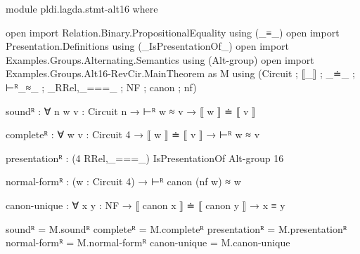 \begin{code}[hide]
module pldi.lagda.stmt-alt16 where

open import Relation.Binary.PropositionalEquality using (_≡_)
open import Presentation.Definitions using (_IsPresentationOf_)
open import Examples.Groups.Alternating.Semantics using (Alt-group)
open import Examples.Groups.Alt16-RevCir.MainTheorem as M
  using (Circuit ; ⟦_⟧ ; _≐_ ; ⊢ᴿ_≈_ ; _RRel,_===_ ; NF ; canon ; nf)
\end{code}
\begin{code}[number=agda:x-sound]
soundᴿ : ∀ {n} {w v : Circuit n} → ⊢ᴿ w ≈ v → ⟦ w ⟧ ≐ ⟦ v ⟧
\end{code}
\begin{code}[number=agda:x-complete]
completeᴿ : ∀ {w v : Circuit 4} → ⟦ w ⟧ ≐ ⟦ v ⟧ → ⊢ᴿ w ≈ v
\end{code}
\begin{code}[number=agda:x-alt]
presentationᴿ : (4 RRel,_===_) IsPresentationOf Alt-group 16
\end{code}
\begin{code}[number=agda:x-nf]
normal-formᴿ : (w : Circuit 4) → ⊢ᴿ canon (nf w) ≈ w
\end{code}
\begin{code}[number=agda:x-unique]
canon-unique : ∀ {x y : NF} → ⟦ canon x ⟧ ≐ ⟦ canon y ⟧ → x ≡ y
\end{code}
\begin{code}[hide]
soundᴿ = M.soundᴿ
completeᴿ = M.completeᴿ
presentationᴿ = M.presentationᴿ
normal-formᴿ = M.normal-formᴿ
canon-unique = M.canon-unique
\end{code}
